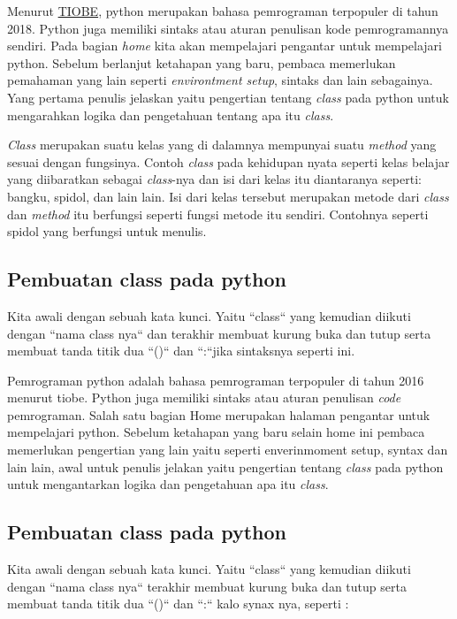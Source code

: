 Menurut \href{https://www.tiobe.com/tiobe-index/}{TIOBE}, python merupakan bahasa pemrograman terpopuler di tahun 2018. Python juga memiliki sintaks atau aturan penulisan kode pemrogramannya sendiri. Pada bagian \textit{home} kita akan mempelajari pengantar untuk mempelajari python. Sebelum berlanjut ketahapan yang baru, pembaca memerlukan pemahaman yang lain seperti \textit{environtment setup}, sintaks dan lain sebagainya. Yang pertama penulis jelaskan yaitu pengertian tentang \textit{class} pada python untuk mengarahkan logika dan pengetahuan tentang apa itu \textit{class}.

\textit{Class} merupakan suatu kelas yang di dalamnya mempunyai suatu \textit{method} yang sesuai dengan fungsinya. Contoh \textit{class} pada kehidupan nyata seperti kelas belajar yang diibaratkan sebagai \textit{class}-nya dan isi dari kelas itu diantaranya seperti: bangku, spidol, dan lain lain. Isi dari kelas tersebut merupakan metode dari \textit{class} dan \textit{method} itu berfungsi seperti fungsi metode itu sendiri. Contohnya seperti spidol yang berfungsi untuk menulis.
\subsection{Pembuatan class pada python}
Kita awali dengan sebuah kata kunci. Yaitu  ``class`` yang kemudian diikuti dengan ``nama class nya`` dan terakhir membuat kurung buka dan tutup serta membuat tanda titik dua  ``()`` dan ``:``jika sintaksnya seperti ini.


Pemrograman python adalah bahasa pemrograman terpopuler di tahun 2016 menurut tiobe. Python juga memiliki sintaks atau aturan penulisan \textit{code} pemrograman. Salah satu bagian Home merupakan halaman pengantar untuk mempelajari python. Sebelum ketahapan yang baru selain home ini pembaca memerlukan pengertian yang lain yaitu seperti enverinmoment setup, syntax dan lain lain, awal untuk penulis jelakan yaitu pengertian tentang \textit{class} pada python untuk mengantarkan logika dan pengetahuan apa itu \textit{class}.

\subsection{Pembuatan class pada python}
Kita awali dengan sebuah kata kunci. Yaitu ``class`` yang kemudian diikuti dengan ``nama class nya`` terakhir membuat kurung buka dan tutup serta membuat tanda titik dua  ``()`` dan ``:`` kalo synax nya, seperti :

